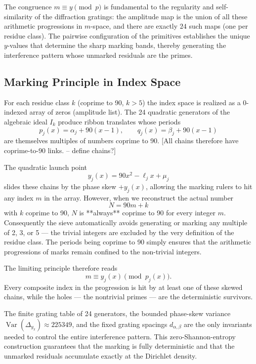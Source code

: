 \documentclass[11pt,a4paper]{article}
\begin{document}
The congruence $m\equiv y\pmod{p}$ is fundamental to the regularity and self-similarity of the diffraction gratings: the amplitude map is the union of all these arithmetic progressions in $m$-space, and there are exactly $24$ such maps (one per residue class). The pairwise configuration of the primitives establishes the unique $y$-values that determine the sharp marking bands, thereby generating the interference pattern whose unmarked residuals are the primes.


\subsection{Marking Principle in Index Space}

For each residue class \(k\) (coprime to 90, \(k>5\)) the index space is realized as a 0-indexed array of zeros (amplitude list). The 24 quadratic generators of the algebraic ideal \(I_k\) produce ribbon translates whose periods
\[
p_j(x)=\alpha_j+90(x-1),\qquad q_j(x)=\beta_j+90(x-1)
\]
are themselves multiples of numbers coprime to 90. [All chains therefore have coprime-to-90 links. -- define chains?]

The quadratic launch point
\[
y_j(x)=90x^2-\ell_j x+\mu_j
\]
slides these chains by the phase skew \(+y_j(x)\), allowing the marking rulers to hit any index \(m\) in the array. However, when we reconstruct the actual number
\[
N=90m+k
\]
with \(k\) coprime to 90, \(N\) is **always** coprime to 90 for every integer \(m\). Consequently the sieve automatically avoids generating or marking any multiple of 2, 3, or 5 — the trivial integers are excluded by the very definition of the residue class. The periods being coprime to 90 simply ensures that the arithmetic progressions of marks remain confined to the non-trivial integers.

The limiting principle therefore reads
\[
m\equiv y_j(x)\pmod{p_j(x)}.
\]
Every composite index in the progression is hit by at least one of these skewed chains, while the holes — the nontrivial primes — are the deterministic survivors.

The finite grating table of 24 generators, the bounded phase-skew variance \(\operatorname{Var}(\Delta_{y_x})\approx225349\), and the fixed grating spacings \(d_{\alpha,\beta}\) are the only invariants needed to control the entire interference pattern. This zero-Shannon-entropy construction guarantees that the marking is fully deterministic and that the unmarked residuals accumulate exactly at the Dirichlet density.
\end{document}
